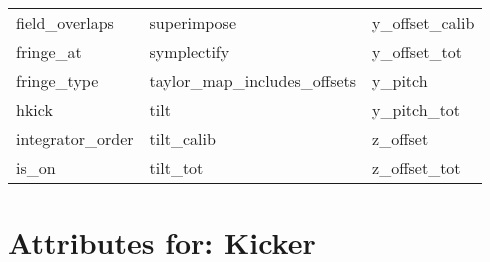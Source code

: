 \begin{tabular}{lll}
field_overlaps              & superimpose                 & y_offset_calib              \\
fringe_at                   & symplectify                 & y_offset_tot                \\
fringe_type                 & taylor_map_includes_offsets & y_pitch                     \\
hkick                       & tilt                        & y_pitch_tot                 \\
integrator_order            & tilt_calib                  & z_offset                    \\
is_on                       & tilt_tot                    & z_offset_tot                \\
 \bottomrule
 \end{tabular}
 \vfill
 
 \section{Attributes for: Kicker}
 \label{s:list.kicker}
 

